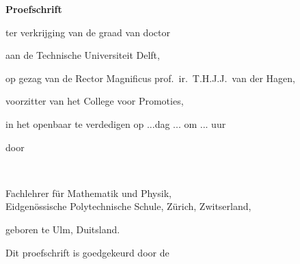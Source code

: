 \begin{titlepage}
\begin{center}


\vspace*{2\bigskipamount}

{\makeatletter
\titlestyle\bfseries\LARGE\@title
\makeatother}

{\makeatletter
    \bigskip
    \titlefont\titleshape\Large\@subtitle
\makeatother}

\vfill


{\Large\bfseries Proefschrift}

\bigskip
\bigskip

ter verkrijging van de graad van doctor

aan de Technische Universiteit Delft,

op gezag van de Rector Magnificus prof.~ir.~T.H.J.J.~van der Hagen,

voorzitter van het College voor Promoties,

in het openbaar te verdedigen op ...dag ... om ... uur

\bigskip
\bigskip

door

\bigskip
\bigskip

\makeatletter
{\Large\titlefont\bfseries\@firstname\ {\titleshape\@lastname}}
\makeatother

\bigskip
\bigskip

Fachlehrer für Mathematik und Physik, \\
Eidgenössische Polytechnische Schule, Zürich, Zwitserland,

geboren te Ulm, Duitsland.

\vspace*{2\bigskipamount}

\end{center}

\clearpage
\thispagestyle{empty}

\noindent Dit proefschrift is goedgekeurd door de


\end{titlepage}
